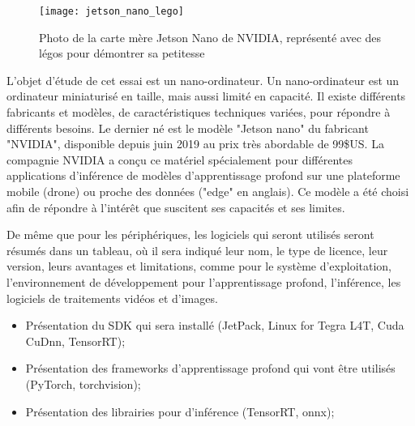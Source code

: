 ﻿{\color{red}
\label{jetson_nano_lego}
\begin{figure}[H]
    \centering
    \texttt{[image: jetson\_nano\_lego]}
    \caption{Photo de la carte mère Jetson Nano de NVIDIA, représenté avec des légos pour démontrer sa petitesse}
    \label{fig:jetson_nano_lego}
\end{figure}

\par L'objet d'étude de cet essai est un nano-ordinateur. Un nano-ordinateur est un ordinateur miniaturisé en taille, mais aussi limité en capacité. Il existe différents fabricants et modèles, de caractéristiques techniques variées, pour répondre à différents besoins. Le dernier né est le modèle "Jetson nano" du fabricant "NVIDIA", disponible depuis juin 2019 au prix très abordable de 99\$US. La compagnie NVIDIA a conçu ce matériel spécialement pour différentes applications d'inférence de modèles d'apprentissage profond sur une plateforme mobile (drone) ou proche des données ("edge" en anglais). Ce modèle a été choisi afin de répondre à l'intérêt que suscitent ses capacités et ses limites. 

\par De même que pour les périphériques, les logiciels qui seront utilisés seront résumés dans un tableau, où il sera indiqué leur nom, le type de licence, leur version, leurs avantages et limitations, comme pour le système d'exploitation, l'environnement de développement pour l'apprentissage profond, l'inférence, les logiciels de traitements vidéos et d'images. 
\begin{itemize}
   \item Présentation du SDK qui sera installé (JetPack, Linux for Tegra L4T, Cuda CuDnn, TensorRT);
   \item Présentation des frameworks d’apprentissage profond qui vont être utilisés (PyTorch, torchvision);
   \item Présentation des librairies pour d'inférence (TensorRT, onnx);
\end{itemize}
}